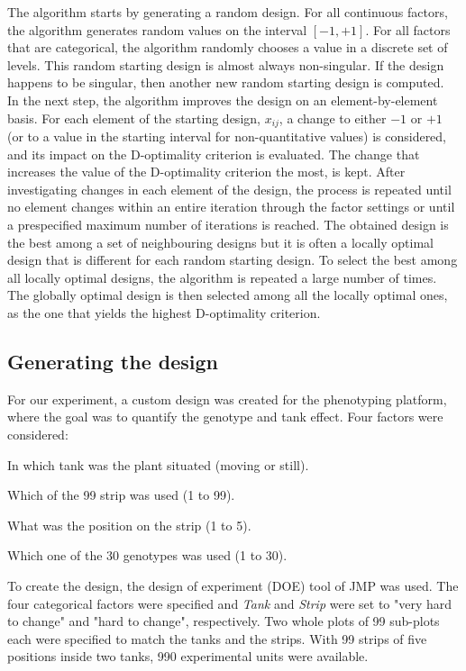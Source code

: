 The algorithm starts by generating a random design. For all continuous factors, the algorithm generates random values on the 
interval $[-1,+1]$. For all factors that are categorical, the algorithm randomly chooses a value in a discrete set of levels. 
This random starting design is almost always non-singular. If the design happens to be singular, then another new random 
starting design is computed.\\

In the next step, the algorithm improves the design on an element-by-element basis. For each element of the starting design, 
$x_{ij}$, a change to either $-1$ or $+1$ (or to a value in the starting interval for non-quantitative values) is considered, and its impact on the D-optimality criterion is evaluated. The change 
that increases the value of the D-optimality criterion the most, is kept. After investigating changes in each element of the 
design, the process is repeated until no element changes within an entire iteration through the factor settings or until a 
prespecified maximum number of iterations is reached. The obtained design is the best among a set of neighbouring designs but it 
is often a locally optimal design that is different for each random starting design. To select the best among all locally 
optimal designs, the algorithm is repeated a large number of times. The globally optimal design is then selected among all the 
locally optimal ones, as the one that yields the highest D-optimality criterion.

\subsection{Generating the design}
For our experiment, a custom design was created for the phenotyping platform, where the goal was to quantify the genotype 
and tank effect. Four factors were considered:

\begin{description}[align=left]
\item [Tank] In which tank was the plant situated (moving or still).
\item [Strip] Which of the 99 strip was used (1 to 99).
\item [Position] What was the position on the strip (1 to 5).
\item [Genotype] Which one of the 30 genotypes was used (1 to 30).
\end{description}

To create the design, the design of experiment (DOE) tool of JMP was used. The four categorical factors were specified and 
\textit{Tank} and \textit{Strip} were set to "very hard to change" and "hard to change", respectively. Two whole plots of 99 
sub-plots each were specified to match the tanks and the strips. With 99 strips of five positions inside two tanks, 990 
experimental units were available.\\

